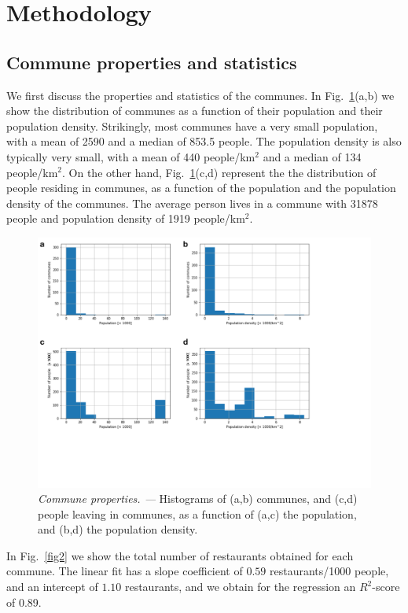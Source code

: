 \documentclass[12pt]{article}
\begin{document}
\section{Methodology}

\subsection{Commune properties and statistics}

We first discuss the properties and statistics of the communes. In Fig.~\ref{fig1}(a,b) we show the distribution of communes as a function of their population and their population density. Strikingly, most communes have a very small population, with a mean of 2590 and a median of 853.5 people. The population density is also typically very small, with a mean of 440 people/km${}^2$ and a median of 134 people/km${}^2$. On the other hand, Fig.~\ref{fig1}(c,d) represent the the distribution of people residing in communes, as a function of the population and the population density of the communes. The average person lives in a commune with 31878 people and population density of 1919 people/km${}^2$.

\begin{figure}
\includegraphics[width=\textwidth]{Figures/Fig1}
\caption{\label{fig1}{\em Commune properties. ---} Histograms of (a,b) communes, and (c,d) people leaving in communes, as a function of (a,c) the population, and (b,d) the population density. }
\end{figure}

In Fig.~\ref{fig2} we show the total number of restaurants obtained for each commune. The linear fit has a slope coefficient of $0.59$ restaurants/1000 people, and an intercept of $1.10$ restaurants, and we obtain for the regression an $R^2$-score of 0.89.
\end{document}
